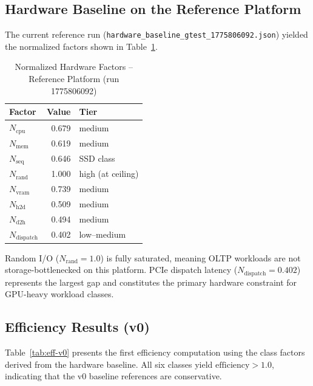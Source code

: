 \documentclass[conference]{IEEEtran}
\begin{document}
\subsection{Hardware Baseline on the Reference Platform}
\label{ssec:hwbaseline}

The current reference run
(\texttt{hardware\_baseline\_gtest\_1775806092.json}) yielded the
normalized factors shown in Table~\ref{tab:hwfactors}.

\begin{table}[t]
  \caption{Normalized Hardware Factors -- Reference Platform
           (run 1775806092)}
  \label{tab:hwfactors}
  \centering
  \begin{tabular}{lrl}
    \toprule
    \textbf{Factor} & \textbf{Value} & \textbf{Tier} \\
    \midrule
    $N_{\text{cpu}}$      & 0.679 & medium \\
    $N_{\text{mem}}$      & 0.619 & medium \\
    $N_{\text{seq}}$      & 0.646 & SSD class \\
    $N_{\text{rand}}$     & 1.000 & high (at ceiling) \\
    $N_{\text{vram}}$     & 0.739 & medium \\
    $N_{\text{h2d}}$      & 0.509 & medium \\
    $N_{\text{d2h}}$      & 0.494 & medium \\
    $N_{\text{dispatch}}$ & 0.402 & low--medium \\
    \bottomrule
  \end{tabular}
\end{table}

Random I/O ($N_{\text{rand}} = 1.0$) is fully saturated, meaning OLTP
workloads are not storage-bottlenecked on this platform.
PCIe dispatch latency ($N_{\text{dispatch}} = 0.402$) represents the
largest gap and constitutes the primary hardware constraint for
GPU-heavy workload classes.

\subsection{Efficiency Results (v0)}
\label{ssec:eff-results}

Table~\ref{tab:eff-v0} presents the first efficiency computation
using the class factors derived from the hardware baseline.
All six classes yield $\text{efficiency} > 1.0$, indicating that the
v0 baseline references are conservative.
\end{document}
